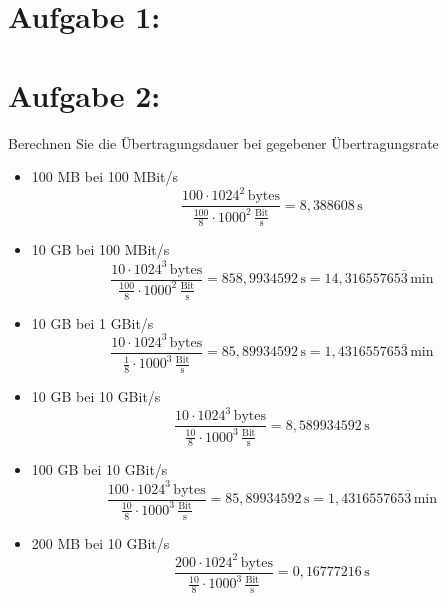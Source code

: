 \section{Aufgabe 1:}


\section{Aufgabe 2:}
Berechnen Sie die Übertragungsdauer bei gegebener Übertragungsrate
\begin{itemize}
\item 100 MB bei 100 MBit/s \\
\begin{equation*}
 \frac{100 \cdot 1024^2 \, \textrm{bytes}}{\frac{100}{8} \cdot 1000^2 \, \frac{\textrm{Bit}}{\textrm{s}}} = 8,388608 \, \textrm{s} 
\end{equation*}

\item 10 GB bei 100 MBit/s \\
\begin{equation*}
 \frac{10 \cdot 1024^3 \, \textrm{bytes}}{\frac{100}{8} \cdot 1000^2 \, \frac{\textrm{Bit}}{\textrm{s}}} = 858,9934592 \, \textrm{s} = 14,31655765\overline{3} \, \textrm{min}
\end{equation*}

\item 10 GB bei 1 GBit/s \\
\begin{equation*}
 \frac{10 \cdot 1024^3 \, \textrm{bytes}}{\frac{1}{8} \cdot 1000^3 \, \frac{\textrm{Bit}}{\textrm{s}}} = 85,89934592 \, \textrm{s} = 1,431655765\overline{3} \, \textrm{min}
\end{equation*}

\item 10 GB bei 10 GBit/s \\
\begin{equation*}
 \frac{10 \cdot 1024^3 \, \textrm{bytes}}{\frac{10}{8} \cdot 1000^3 \, \frac{\textrm{Bit}}{\textrm{s}}} = 8,589934592 \, \textrm{s}
\end{equation*}

\item 100 GB bei 10 GBit/s \\
\begin{equation*}
 \frac{100 \cdot 1024^3 \, \textrm{bytes}}{\frac{10}{8} \cdot 1000^3 \, \frac{\textrm{Bit}}{\textrm{s}}} = 85,89934592 \, \textrm{s} = 1,431655765\overline{3} \, \textrm{min}
\end{equation*}

\item 200 MB bei 10 GBit/s \\
\begin{equation*}
 \frac{200 \cdot 1024^2 \, \textrm{bytes}}{\frac{10}{8} \cdot 1000^3 \, \frac{\textrm{Bit}}{\textrm{s}}} = 0,16777216 \, \textrm{s}
\end{equation*}


\end{itemize}
